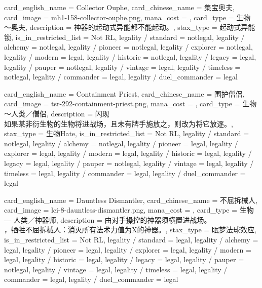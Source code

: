 \documentclass[lang = cn, color = black, 10pt]{AllThatStax}
\begin{document}
\card
{
	card_english_name = {Collector Ouphe},
	card_chinese_name = {集宝奥夫},
	card_image = mh1-158-collector-ouphe.png,
	mana_cost = ,
	card_type = 生物 ～奥夫,
	description = {神器的起动式异能都不能起动。},
	stax_type = 起动式异能锁,
	is_in_restricted_list = Not RL,
	legality / standard = notlegal,
	legality / alchemy = notlegal,
	legality / pioneer = notlegal,
	legality / explorer = notlegal,
	legality / modern = legal,
	legality / historic = notlegal,
	legality / legacy = legal,
	legality / pauper = notlegal,
	legality / vintage = legal,
	legality / timeless = notlegal,
	legality / commander = legal,
	legality / duel_commander = legal
}

\card
{
	card_english_name = {Containment Priest},
	card_chinese_name = {围护僧侣},
	card_image = tsr-292-containment-priest.png,
	mana_cost = ,
	card_type = 生物 ～人类／僧侣,
	description = {闪现\\
		如果某非衍生物的生物将进战场，且未有牌手施放之，则改为将它放逐。},
	stax_type = 生物Hate,
	is_in_restricted_list = Not RL,
	legality / standard = notlegal,
	legality / alchemy = notlegal,
	legality / pioneer = legal,
	legality / explorer = legal,
	legality / modern = legal,
	legality / historic = legal,
	legality / legacy = legal,
	legality / pauper = notlegal,
	legality / vintage = legal,
	legality / timeless = legal,
	legality / commander = legal,
	legality / duel_commander = legal
}

\card
{
	card_english_name = {Dauntless Dismantler},
	card_chinese_name = {不屈拆械人},
	card_image = lci-8-dauntless-dismantler.png,
	mana_cost = ,
	card_type = 生物 — 人类／神器师,
	description = {由对手操控的神器须横置进战场。\\
		，牺牲不屈拆械人：消灭所有法术力值为X的神器。},
	stax_type = 眠梦法球效应,
	is_in_restricted_list = Not RL,
	legality / standard = legal,
	legality / alchemy = legal,
	legality / pioneer = legal,
	legality / explorer = legal,
	legality / modern = legal,
	legality / historic = legal,
	legality / legacy = legal,
	legality / pauper = notlegal,
	legality / vintage = legal,
	legality / timeless = legal,
	legality / commander = legal,
	legality / duel_commander = legal
}
\end{document}

